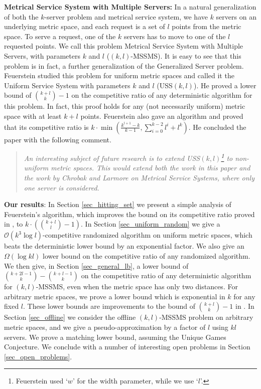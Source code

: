 \documentclass[11pt]{article}
\theoremstyle{plain}\newtheorem{theorem}{Theorem}
\theoremstyle{definition}
\theoremstyle{remark}
\begin{document}
\noindent
\textbf{Metrical Service System with Multiple Servers:} In a natural generalization of both the $k$-server problem and metrical service system, we have $k$ servers on an underlying metric space, and each request is a set of $l$ points from the metric space. To serve a request, one of the $k$ servers has to move to one of the $l$ requested points. We call this problem Metrical Service System with Multiple Servers, with parameters $k$ and $l$ ($(k,l)$-MSSMS). It is easy to see that this problem is in fact, a further generalization of the Generalized Server problem. Feuerstein \cite{Feuerstein98} studied this problem for uniform metric spaces and called it the Uniform Service System with parameters $k$ and $l$ (USS$(k,l)$). He proved a lower bound of ${{k+l}\choose{k}}-1$ on the competitive ratio of any deterministic algorithm for this problem. In fact, this proof holds for any (not necessarily uniform) metric space with at least $k+l$ points. Feuerstein also gave an algorithm and proved that its competitive ratio is $k\cdot\min\left(\frac{k^{l+1}-k}{k-1},\sum_{i=0}^{k-2}l^i+l^k\right)$. He concluded the paper with the following comment.
\begin{quote}
\textit{An interesting subject of future research is to extend USS$(k,l)$\footnote{Feuerstein used `$w$' for the width parameter, while we use `$l$'.} to non-uniform metric spaces. This would extend both the work in this paper and the work by Chrobak and Larmore \cite{ChrobakL92} on Metrical Service Systems, where only one server is considered.}
\end{quote}









\noindent
\textbf{Our results}: In Section \ref{sec_hitting_set} we present a simple analysis of Feuerstein's algorithm, which improves the bound on its competitive ratio proved in \cite{Feuerstein98}, to $k\cdot\left({{k+l}\choose{l}}-1\right)$. In Section \ref{sec_uniform_random} we give a $\mathcal{O}(k^3\log l)$-competitive randomized algorithm 
on uniform metric spaces, which beats the deterministic lower bound by an exponential factor. We also give an $\Omega(\log kl)$ lower bound on the competitive ratio of any randomized algorithm. 
We then give, in Section \ref{sec_general_lb}, a lower bound of ${{k+2l-1}\choose{k}}-{{k+l-1}\choose{k}}$ on the competitive ratio of any deterministic algorithm for $(k,l)$-MSSMS, even when the metric space has only two distances. For arbitrary metric spaces, we prove a lower bound which is exponential in $k$ for any fixed $l$.
These lower bounds are improvements to the bound of ${{k+l}\choose{k}}-1$ in \cite{Feuerstein98}. In Section \ref{sec_offline} we consider the offline $(k,l)$-MSSMS problem on arbitrary metric spaces, and we give a pseudo-approximation by a factor of $l$ using $kl$ servers. We prove a matching lower bound, assuming the Unique Games Conjecture. We conclude with a number of interesting open problems in Section \ref{sec_open_problems}. 
\end{document}
